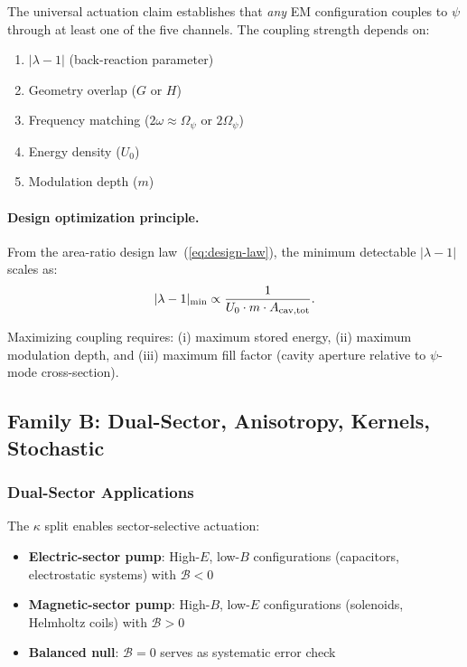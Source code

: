 \documentclass[aps,prd,twocolumn,superscriptaddress,floatfix,nofootinbib]{revtex4-2}
\newcommand{\Opsi}{\Omega_\psi}
\newcommand{\lam}{\lambda}
\begin{document}
The universal actuation claim establishes that \emph{any} EM configuration
couples to $\psi$ through at least one of the five channels. The
coupling strength depends on:
\begin{enumerate}[nosep]
\item $|\lam-1|$ (back-reaction parameter)
\item Geometry overlap ($G$ or $H$)
\item Frequency matching ($2\omega \approx \Opsi$ or $2\Opsi$)
\item Energy density ($U_0$)
\item Modulation depth ($m$)
\end{enumerate}

\paragraph{Design optimization principle.}
From the area-ratio design law~(\ref{eq:design-law}), the minimum
detectable $|\lam-1|$ scales as:
\begin{equation}
|\lam-1|_{\rm min} \propto \frac{1}{U_0 \cdot m \cdot A_{\rm cav,tot}}.
\end{equation}

Maximizing coupling requires: (i) maximum stored energy,
(ii) maximum modulation depth, and (iii) maximum fill factor
(cavity aperture relative to $\psi$-mode cross-section).

\subsection{Family B: Dual-Sector, Anisotropy, Kernels, Stochastic}

\subsubsection{Dual-Sector Applications}

The $\kappa$ split enables sector-selective actuation:
\begin{itemize}[nosep]
\item \textbf{Electric-sector pump}: High-$E$, low-$B$ configurations
(capacitors, electrostatic systems) with $\mathcal{B} < 0$
\item \textbf{Magnetic-sector pump}: High-$B$, low-$E$ configurations
(solenoids, Helmholtz coils) with $\mathcal{B} > 0$
\item \textbf{Balanced null}: $\mathcal{B} = 0$ serves as systematic
error check
\end{itemize}
\end{document}
